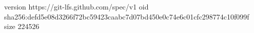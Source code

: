 version https://git-lfs.github.com/spec/v1
oid sha256:defd5e08d3266f72bc59423caabc7d07bd450e0c74e6c01cfc298774c10f099f
size 224526
